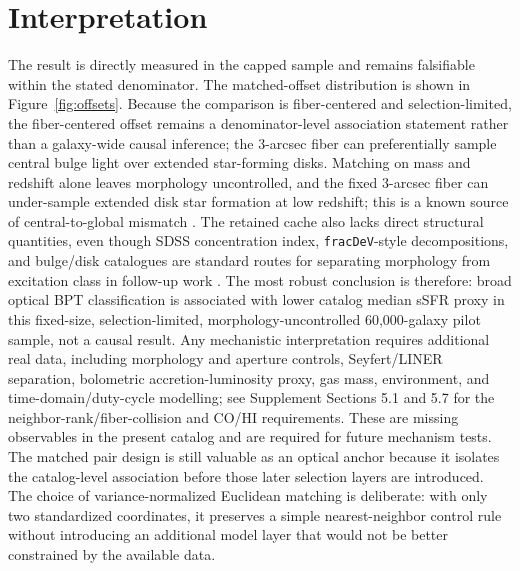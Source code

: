 \documentclass[twocolumn]{aastex631}
\begin{document}
\section{Interpretation}
The result is directly measured in the capped sample and remains falsifiable within the stated denominator. The matched-offset distribution is shown in Figure~\ref{fig:offsets}. Because the comparison is fiber-centered and selection-limited, the fiber-centered offset remains a denominator-level association statement rather than a galaxy-wide causal inference; the 3-arcsec fiber can preferentially sample central bulge light over extended star-forming disks. Matching on mass and redshift alone leaves morphology uncontrolled, and the fixed 3-arcsec fiber can under-sample extended disk star formation at low redshift; this is a known source of central-to-global mismatch \citep[e.g.,][]{kewley2005,harrison2017,ellison2021}. The retained cache also lacks direct structural quantities, even though SDSS concentration index, \texttt{fracDeV}-style decompositions, and bulge/disk catalogues are standard routes for separating morphology from excitation class in follow-up work \citep{strateva2001,mendel2014,bluck2014,piotrowska2022}. The most robust conclusion is therefore: broad optical BPT classification is associated with lower catalog median sSFR proxy in this fixed-size, selection-limited, morphology-uncontrolled 60,000-galaxy pilot sample, not a causal result. Any mechanistic interpretation requires additional real data, including morphology and aperture controls, Seyfert/LINER separation, bolometric accretion-luminosity proxy, gas mass, environment, and time-domain/duty-cycle modelling; see Supplement Sections 5.1 and 5.7 for the neighbor-rank/fiber-collision and CO/HI requirements. These are missing observables in the present catalog and are required for future mechanism tests.
The matched pair design is still valuable as an optical anchor because it isolates the catalog-level association before those later selection layers are introduced.
The choice of variance-normalized Euclidean matching is deliberate: with only two standardized coordinates, it preserves a simple nearest-neighbor control rule without introducing an additional model layer that would not be better constrained by the available data.
\end{document}
